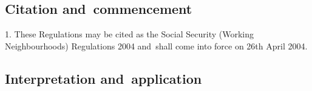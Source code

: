 \documentclass[12pt,a4paper]{article}
\begin{document}
{\sloppy

\tableofcontents

}

\bigskip

\setcounter{secnumdepth}{-2}

\subsection[1. Citation and~commencement]{Citation and~commencement}

1.  These Regulations may be cited as the Social Security (Working Neighbourhoods) Regulations 2004 and~shall come into force on 26th April 2004.

\subsection[2. Interpretation and~application]{Interpretation and~application}
\end{document}
